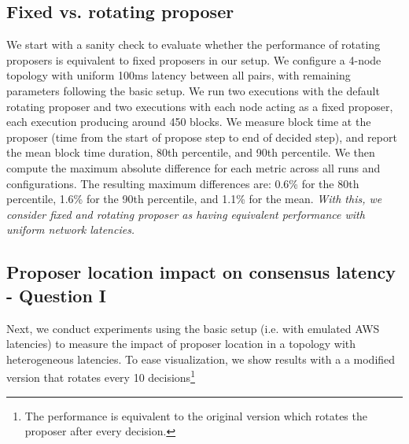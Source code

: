 
\subsection{Fixed vs. rotating proposer}
We start with a sanity check to evaluate whether the performance of rotating proposers is equivalent to fixed proposers in our setup. We configure a 4-node topology with uniform 100ms latency between all pairs, with remaining parameters following the basic setup. We run two executions with the default rotating proposer and two executions with each node acting as a fixed proposer, each execution producing around 450 blocks.  We measure block time at the proposer (time from the start of propose step to end of decided step), and report the mean block time duration, 80th percentile, and 90th percentile.  We then compute the maximum absolute difference for each metric across all runs and configurations. The resulting maximum differences are: 0.6\% for the 80th percentile, 1.6\% for the 90th percentile, and 1.1\% for the mean.  {\it With this, we consider fixed and rotating proposer as having equivalent performance with uniform network latencies.} 



\subsection{Proposer location impact on consensus latency - Question I}

Next, we conduct experiments using the basic setup (i.e. with emulated AWS latencies) to measure the impact of proposer location in a topology with heterogeneous latencies.  To ease visualization, we show results with a a modified version that rotates every 10 decisions\footnote{The performance is equivalent to the original version which rotates the proposer after every decision.}
%

